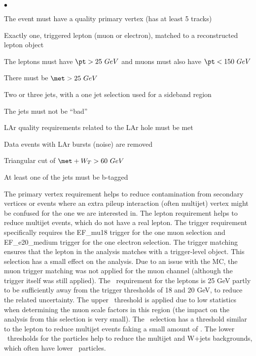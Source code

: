 \begin{list} {$\bullet$} {}
\item The event must have a quality primary vertex (has at least 5 tracks)
\item Exactly one, triggered lepton (muon or electron), matched to a reconstructed lepton object
\item The leptons must have $\pt > 25~GeV$ and muons must also have $\pt < 150~GeV$ 
\item There must be $\met > 25~GeV$
\item Two or three jets, with a one jet selection used for a sideband region
\item The jets must not be ``bad''
\item LAr quality requirements related to the LAr hole must be met
\item Data events with LAr bursts (noise) are removed
\item Triangular cut of $\met + W_{T} > 60~GeV$
\item At least one of the jets must be b-tagged
\end{list}

The primary vertex requirement helps to reduce contamination from secondary vertices or events where an extra pileup interaction (often multijet) vertex might be confused for the one we are interested in.  The lepton requirement helps to reduce multijet events, which do not have a real lepton.  The trigger requirement specifically requires the EF\_mu18 trigger for the one muon selection and EF\_e20\_medium trigger for the one electron selection.  The trigger matching ensures that the lepton in the analysis matches with a trigger-level object.  This selection has a small effect on the analysis.   Due to an issue with the MC, the muon trigger matching was not applied for the muon channel (although the trigger itself was still applied).  The \pt~requirement for the leptons is 25 GeV partly to be sufficiently away from the trigger thresholds of 18 and 20 GeV, to reduce the related uncertainty.  The upper \pt~threshold is applied due to low statistics when determining the muon scale factors in this region (the impact on the analysis from this selection is very small).  The \met~selection has a threshold similar to the lepton to reduce multijet events faking a small amount of \met.  The lower \pt~thresholds for the particles help to reduce the multijet and W+jets backgrounds, which often have lower \pt~particles.

